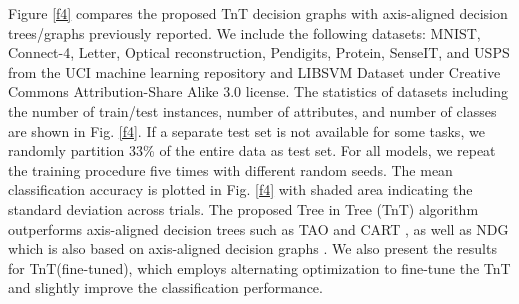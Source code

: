 \documentclass{article}
\begin{document}
\begin{table}[h]
  \caption{Comparison of TnT and CART at  optimal split count (\#S, determined by cross-validation). Mean test accuracy (±standard deviation) are calculated on 5 independent trials.}
  \label{table0}
  \centering
\end{table}

Figure \ref{f4} compares the proposed TnT decision graphs with axis-aligned decision trees/graphs previously reported. We include the following datasets: MNIST, Connect-4, Letter, Optical reconstruction, Pendigits, Protein, SenseIT, and USPS from the UCI machine learning repository \cite{UC} and LIBSVM Dataset \cite{LIBSVM} under Creative Commons Attribution-Share Alike 3.0 license. The statistics of datasets including the number of train/test instances, number of attributes, and number of classes are shown in Fig. \ref{f4}. If a separate test set is not available for some tasks, we randomly partition 33\% of the entire data as test set. For all models, we repeat the training procedure five times with different random seeds. The mean classification accuracy is plotted in Fig. \ref{f4} with shaded area indicating the standard deviation across trials. The proposed Tree in Tree (TnT) algorithm outperforms axis-aligned decision trees such as TAO \cite{carreira2018alternating, zharmagambetov2019experimental} and CART \cite{steinberg2009cart}, as well as NDG which is also based on axis-aligned decision graphs \cite{oliver1992decision}. We also present the results for TnT(fine-tuned), which employs alternating optimization to fine-tune the TnT and slightly improve the classification performance.
\end{document}
